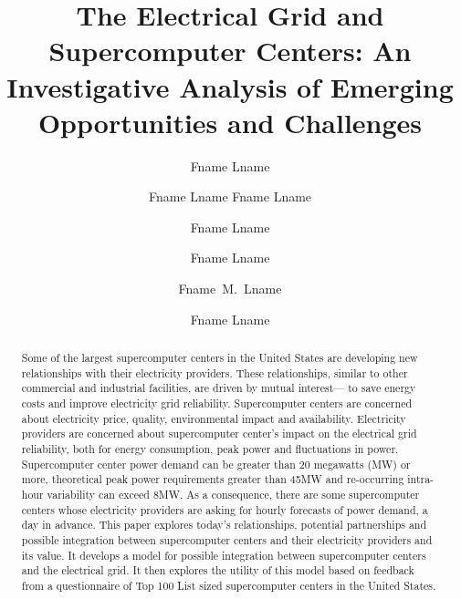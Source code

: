 \documentclass{llncs}
\begin{document}
%
\frontmatter          %
%
\pagestyle{headings}  %
%
%
\mainmatter              %
%
\title{
The Electrical Grid and Supercomputer Centers:  
An Investigative Analysis of Emerging Opportunities and Challenges
}

%
%
%
\author{Fname Lname \and Fname Lname
Fname Lname \and Fname Lname \and Fname Lname \and Fname~M.~Lname \and
Fname Lname}
%
%
%

\maketitle              %

\begin{abstract}
Some of the largest supercomputer centers in the United 
States are developing new relationships with their 
electricity providers.  These relationships, similar to other commercial 
and industrial facilities, are driven by mutual interest— to save energy 
costs and improve electricity grid reliability.  Supercomputer centers are concerned about 
electricity price, quality, environmental impact and 
availability. Electricity providers are concerned about 
supercomputer center's impact on the electrical grid reliability, both 
for energy consumption, peak power and fluctuations in 
power. Supercomputer center power demand can be greater 
than 20 megawatts (MW) or more, theoretical peak power requirements 
greater than 45MW and re-occurring intra-hour variability 
can exceed 8MW. As a consequence, there are some 
supercomputer centers whose electricity providers are 
asking for hourly forecasts of power demand, a day in 
advance.   This paper explores today's relationships, 
potential partnerships and possible integration between 
supercomputer centers and their electricity providers and its value. It 
develops a model for possible integration between 
supercomputer centers and the electrical grid. It then 
explores the utility of this model based on feedback from a 
questionnaire of Top 100 List sized supercomputer centers 
in the United States.
\end{abstract}
\end{document}
